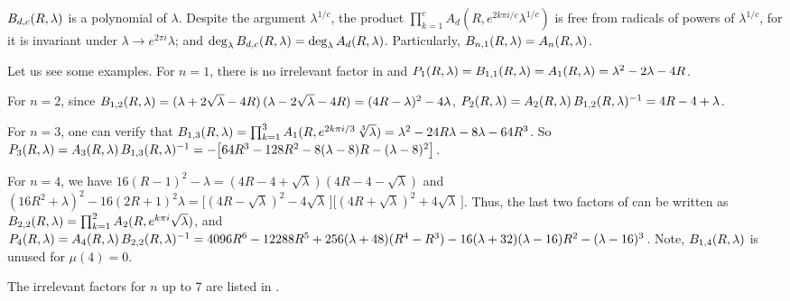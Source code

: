 \documentclass{ws-ijbc}
\begin{document}
\begin{remark}
$B_{d,c}(R, \lambda)$ is a polynomial of $\lambda$.
Despite the argument $\lambda^{1/c}$,
  the product $\prod_{k=1}^c A_d(R, e^{2k\pi i/c} \lambda^{1/c})$
  is free from radicals of powers of $\lambda^{1/c}$,
  for it is invariant under $\lambda \rightarrow e^{2\pi i} \lambda$;
and $\deg_\lambda B_{d,c}(R, \lambda) = \deg_\lambda A_d(R, \lambda)$.
Particularly, $B_{n,1}(R, \lambda) = A_n(R, \lambda)$.
\end{remark}




Let us see some examples.
%
For $n = 1$,
there is no irrelevant factor
in  and
$P_1(R, \lambda) = B_{1,1}(R, \lambda) = A_1(R, \lambda) = \lambda^2 - 2\lambda - 4R$.



For $n = 2$, since
$B_{1,2}(R, \lambda)
=
(\lambda +2\sqrt{\lambda} - 4R)
\,
(\lambda -2\sqrt{\lambda} - 4R)
=(4R-\lambda)^2 -4\lambda$,
%
$P_2(R, \lambda) = A_2(R, \lambda) \, B_{1,2}(R, \lambda)^{-1} = 4R - 4 + \lambda$.



For $n = 3$,
one can verify that
$B_{1,3}(R, \lambda)
= \prod_{k=1}^3 A_1(R, e^{2k\pi i/3} \, \sqrt[3]{\lambda})
=  \lambda^2 - 24 R \lambda - 8 \lambda - 64 R^3$.
%
So
$P_3(R, \lambda) = A_3(R, \lambda) \, B_{1,3}(R, \lambda)^{-1}
= -\big[64 R^3- 128 R^2 -8(\lambda -8)R-(\lambda-8)^2\big]$.



For $n = 4$,
we have
$16 (R-1)^2 - \lambda
= (4R - 4 + \sqrt{\lambda})(4R - 4 - \sqrt{\lambda})$
and
$
(16 R^2 + \lambda)^2 - 16 (2R+1)^2 \lambda
=
\big[(4R - \sqrt{\lambda})^2  - 4\sqrt{\lambda}\,\big]
\big[(4R + \sqrt{\lambda})^2  + 4\sqrt{\lambda}\,\big]$.
Thus, the last two factors of 
can be written as
$B_{2,2}(R, \lambda) = \prod_{k=1}^2 A_2(R, e^{k \pi i} \sqrt{\lambda})$,
and
%
$P_4(R, \lambda)
    = A_4(R, \lambda) \, B_{2,2}(R, \lambda)^{-1}
    = 4096 R^6-12288 R^5+ 256 (\lambda + 48) (R^4- R^3)
    -16(\lambda + 32)(\lambda - 16) R^2 - (\lambda-16)^3$.
Note, $B_{1,4}(R, \lambda)$ is unused for $\mu(4) = 0$.


The irrelevant factors for $n$ up to 7 are listed in .



\newcommand{\T}{{R_4}}
\end{document}
